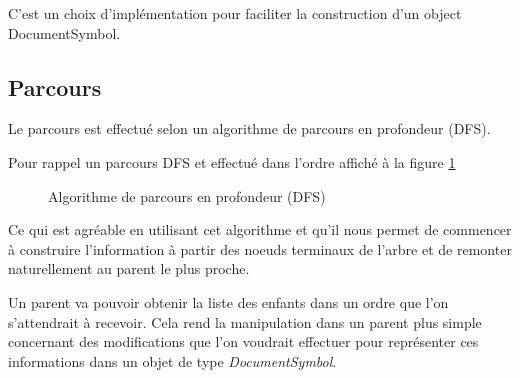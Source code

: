 \documentclass[
    iict, %
    il, %
]{heig-tb}
\begin{document}
C'est un choix d'implémentation pour faciliter la construction d'un object DocumentSymbol.

\subsection{Parcours}
Le parcours est effectué selon un algorithme de parcours en profondeur (DFS).







Pour rappel un parcours DFS et effectué dans l'ordre affiché à la figure \ref*{Algorithme de parcours en profondeur (DFS)}

\begin{figure}[!h]
    \begin{center}
    \end{center}
    \caption[Algorithme de parcours en profondeur (DFS)]{\label{Algorithme de parcours en profondeur (DFS)} Algorithme de parcours en profondeur (DFS)}
\end{figure}

Ce qui est agréable en utilisant cet algorithme et qu'il nous permet de commencer à construire l'information à partir des noeuds terminaux
de l'arbre et de remonter naturellement au parent le plus proche.

Un parent va pouvoir obtenir la liste des enfants dans un ordre que l'on s'attendrait à recevoir.
Cela rend la manipulation dans un parent plus simple concernant des modifications que l'on voudrait effectuer pour représenter ces informations
dans un objet de type \emph{DocumentSymbol}.
\end{document}
